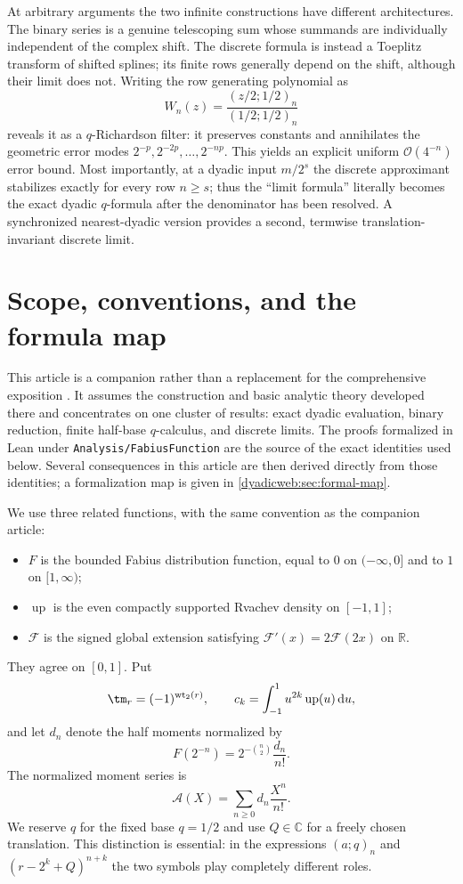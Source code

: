 \documentclass[11pt,oneside]{article}
\theoremstyle{definition}
\theoremstyle{remark}
\newcommand{\R}{\mathbb R}
\newcommand{\C}{\mathbb C}
\newcommand{\Up}{\operatorname{up}}
\newcommand{\wt}{\operatorname{wt}_2}
\newcommand{\dd}{\,\mathrm d}
\newcommand{\bigO}{\mathcal O}
\newcommand{\repo}{\nolinkurl{Analysis/FabiusFunction}}
\begin{document}
At arbitrary arguments the two infinite constructions have different architectures.  The
binary series is a genuine telescoping sum whose summands are individually independent of the
complex shift.  The discrete formula is instead a Toeplitz transform of shifted splines; its
finite rows generally depend on the shift, although their limit does not.  Writing the row
generating polynomial as
\[
 W_n(z)=\frac{(z/2;1/2)_n}{(1/2;1/2)_n}
\]
reveals it as a $q$-Richardson filter: it preserves constants and annihilates the geometric
error modes $2^{-p},2^{-2p},\ldots,2^{-np}$.  This yields an explicit uniform
$\bigO(4^{-n})$ error bound.  Most importantly, at a dyadic input $m/2^s$ the discrete
approximant stabilizes exactly for every row $n\ge s$; thus the ``limit formula'' literally
becomes the exact dyadic $q$-formula after the denominator has been resolved.  A synchronized
nearest-dyadic version provides a second, termwise translation-invariant discrete limit.


\section{Scope, conventions, and the formula map}
\label{dyadicweb:sec:scope}

This article is a companion rather than a replacement for the comprehensive exposition
\cite{dyadicweb:mainarticle}.  It assumes the construction and basic analytic theory developed there
and concentrates on one cluster of results: exact dyadic evaluation, binary reduction, finite
half-base $q$-calculus, and discrete limits.  The proofs formalized in Lean under \repo
\cite{dyadicweb:proveit} are the source of the exact identities used below.  Several consequences in
this article are then derived directly from those identities; a formalization map is given in
\cref{dyadicweb:sec:formal-map}.

We use three related functions, with the same convention as the companion article:
\begin{itemize}
\item $F$ is the bounded Fabius distribution function, equal to $0$ on $(-\infty,0]$ and to
      $1$ on $[1,\infty)$;
\item $\Up$ is the even compactly supported Rvachev density on $[-1,1]$;
\item $\mathcal F$ is the signed global extension satisfying
      $\mathcal F'(x)=2\mathcal F(2x)$ on $\R$.
\end{itemize}
They agree on $[0,1]$.  Put
\[
 \tm_r=(-1)^{\wt(r)},\qquad
 c_k=\int_{-1}^{1}u^{2k}\Up(u)\dd u,
\]
and let $d_n$ denote the half moments normalized by
\begin{equation}
 F(2^{-n})=2^{-\binom n2}\frac{d_n}{n!}.                 \label{dyadicweb:eq:inverse-dyadic-input}
\end{equation}
The normalized moment series is
\begin{equation}
 \mathscr A(X)=\sum_{n\ge0}d_n\frac{X^n}{n!}.             \label{dyadicweb:eq:A-def}
\end{equation}
We reserve $q$ for the fixed base $q=1/2$ and use $Q\in\C$ for a freely chosen translation.
This distinction is essential: in the expressions $(a;q)_n$ and
$(r-2^k+Q)^{n+k}$ the two symbols play completely different roles.
\end{document}
